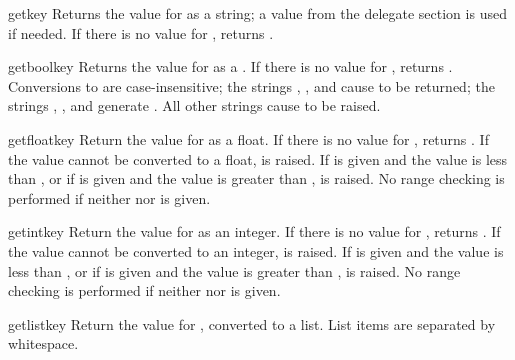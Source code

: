 \documentclass{howto}
\begin{document}
\begin{methoddesc}[Configuration]{get}{key}
  Returns the value for  as a string; a value from the
  delegate section is used if needed.  If there is no value for
  , returns .
\end{methoddesc}

\begin{methoddesc}[Configuration]{getbool}{key}
  Returns the value for  as a .  If there is no
  value for , returns .  Conversions to
   are case-insensitive; the strings ,
  , and  cause  to be returned; the
  strings , , and  generate
  .  All other strings cause  to be
  raised.
\end{methoddesc}

\begin{methoddesc}[Configuration]{getfloat}{key}
  Return the value for  as a float.  If there is no
  value for , returns .  If the value cannot
  be converted to a float,  is raised.  If
   is given and the value is less than , or if
   is given and the value is greater than ,
   is raised.  No range checking is performed if
  neither  nor  is given.
\end{methoddesc}

\begin{methoddesc}[Configuration]{getint}{key}
  Return the value for  as an integer.  If there is no
  value for , returns .  If the value cannot
  be converted to an integer,  is raised.  If
   is given and the value is less than , or if
   is given and the value is greater than ,
   is raised.  No range checking is performed if
  neither  nor  is given.
\end{methoddesc}

\begin{methoddesc}[Configuration]{getlist}{key}
  Return the value for , converted to a list.  List items are
  separated by whitespace.
\end{methoddesc}
\end{document}

